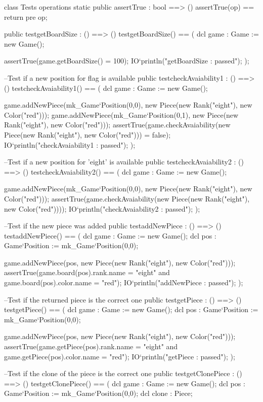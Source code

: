 \begin{vdm_al}
class Tests
 operations
  static public assertTrue : bool ==> ()
                assertTrue(op) == return
        pre op;
  
  public testgetBoardSize : () ==> ()
   testgetBoardSize() ==
   (
    dcl game : Game := new Game();
    
    assertTrue(game.getBoardSize() = 100);
    IO`println("getBoardSize : passed");
   );
   
  --Test if a new position for flag is available
  public testcheckAvaiability1 : () ==> ()
   testcheckAvaiability1() ==
   (
    dcl game : Game := new Game();
    
    game.addNewPiece(mk_Game`Position(0,0), new Piece(new Rank("eight"), new Color("red")));
    game.addNewPiece(mk_Game`Position(0,1), new Piece(new Rank("eight"), new Color("red")));
    assertTrue(game.checkAvaiability(new Piece(new Rank("eight"), new Color("red"))) = false);
    IO`println("checkAvaiability1 : passed");
   );
  
  --Test if a new position for 'eight' is available
  public testcheckAvaiability2 : () ==> ()
   testcheckAvaiability2() ==
   (
    dcl game : Game := new Game();
    
    game.addNewPiece(mk_Game`Position(0,0), new Piece(new Rank("eight"), new Color("red")));
    assertTrue(game.checkAvaiability(new Piece(new Rank("eight"), new Color("red"))));
    IO`println("checkAvaiability2 : passed");
   );

  --Test if the new piece was added
  public testaddNewPiece : () ==> ()
   testaddNewPiece() ==
   (
    dcl game : Game := new Game();
    dcl pos : Game`Position := mk_Game`Position(0,0);
    
    game.addNewPiece(pos, new Piece(new Rank("eight"), new Color("red")));
    assertTrue(game.board(pos).rank.name = "eight" and game.board(pos).color.name = "red");
    IO`println("addNewPiece : passed");
   );
  
  --Test if the returned piece is the correct one 
  public testgetPiece : () ==> ()
   testgetPiece() ==
   (
    dcl game : Game := new Game();
    dcl pos : Game`Position := mk_Game`Position(0,0);
    
    game.addNewPiece(pos, new Piece(new Rank("eight"), new Color("red")));
    assertTrue(game.getPiece(pos).rank.name = "eight" and game.getPiece(pos).color.name = "red");
    IO`println("getPiece : passed");
   );
  
  --Test if the clone of the piece is the correct one
  public testgetClonePiece : () ==> ()
   testgetClonePiece() ==
   (
    dcl game : Game := new Game();
    dcl pos : Game`Position := mk_Game`Position(0,0);
    dcl clone : Piece;
    

\end{vdm_al}
